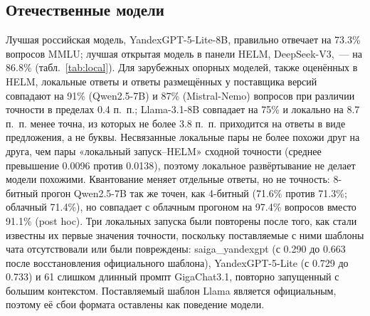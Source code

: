 \documentclass[preprint,12pt,authoryear]{elsarticle}
\begin{document}
\subsection{Отечественные модели}
Лучшая российская модель, YandexGPT-5-Lite-8B, правильно отвечает на 73.3\% вопросов MMLU; лучшая открытая модель в панели HELM, DeepSeek-V3,~--- на 86.8\% (табл.~\ref{tab:local}). Для зарубежных опорных моделей, также оценённых в HELM, локальные ответы и ответы размещённых у поставщика версий совпадают на 91\% (Qwen2.5-7B) и 87\% (Mistral-Nemo) вопросов при различии точности в пределах 0.4 п.~п.; Llama-3.1-8B совпадает на 75\% и локально на 8.7 п.~п. менее точна, из которых не более 3.8 п.~п. приходится на ответы в виде предложения, а не буквы. Несвязанные локальные пары не более похожи друг на друга, чем пары «локальный запуск--HELM» сходной точности (среднее превышение 0.0096 против 0.0138), поэтому локальное развёртывание не делает модели похожими. Квантование меняет отдельные ответы, но не точность: 8-битный прогон Qwen2.5-7B так же точен, как 4-битный (71.6\% против 71.3\%; облачный 71.4\%), но совпадает с облачным прогоном на 97.4\% вопросов вместо 91.1\% (post hoc). Три локальных запуска были повторены после того, как стали известны их первые значения точности, поскольку поставляемые с ними шаблоны чата отсутствовали или были повреждены: saiga\_yandexgpt (с 0.290 до 0.663 после восстановления официального шаблона), YandexGPT-5-Lite (с 0.729 до 0.733) и 61 слишком длинный промпт GigaChat3.1, повторно запущенный с большим контекстом. Поставляемый шаблон Llama является официальным, поэтому её сбои формата оставлены как поведение модели.

\begin{table}[!htbp]
\centering
\caption{Локальные запуски на HELM MMLU (14,038 вопросов).}
\label{tab:local}
\small
{}
\end{table}
\end{document}
